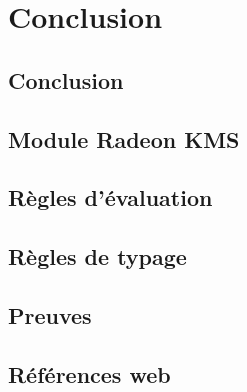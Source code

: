 \documentclass[a4paper,11pt]{memoir}
\begin{document}
\label{cha:etudedecas}




\part{Conclusion}

\chapter{Conclusion}

\label{cha:conclusion}


\appendix
\renewcommand{\appendixpagename}{Annexes}
\renewcommand{\appendixtocname}{\appendixpagename}
\appendixpage*

\chapter{Module Radeon KMS}

\label{cha:code-noyau}


\chapter{Règles d'évaluation}



\chapter{Règles de typage}



\chapter{Preuves}




%

\backmatter


\clearpage

\listoffigures

\clearpage

\renewcommand{\listtheoremname}{Liste des définitions}
\listoftheorems[ignoreall,show={definition}]

\renewcommand{\listtheoremname}{Liste des théorèmes et propriétés}
\listoftheorems[ignoreall,show={theorem,lemma}]

\chapter{Références web}

\insertlinks



\end{document}
